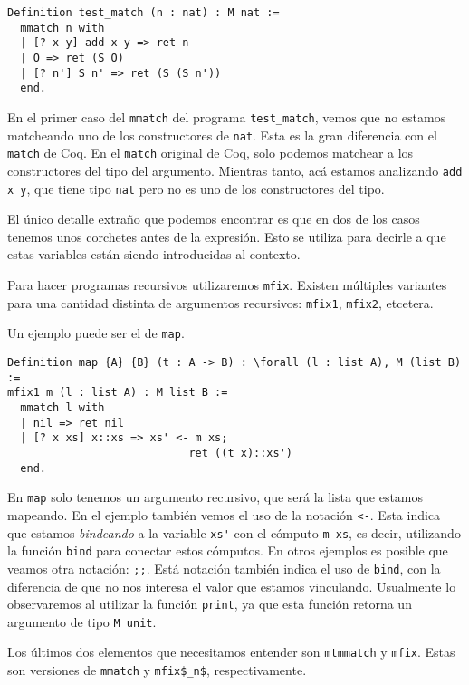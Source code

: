 \begin{lstlisting}
Definition test_match (n : nat) : M nat :=
  mmatch n with
  | [? x y] add x y => ret n
  | O => ret (S O)
  | [? n'] S n' => ret (S (S n'))
  end.
\end{lstlisting}

En el primer caso del \lstinline{mmatch} del programa \lstinline{test_match}, vemos que no estamos matcheando uno de los constructores de \lstinline{nat}.
Esta es la gran diferencia con el \lstinline{match} de Coq.
En el \lstinline{match} original de Coq, solo podemos matchear a los constructores del tipo del argumento.
Mientras tanto, acá estamos analizando \lstinline{add x y}, que tiene tipo \lstinline{nat} pero no es uno de los constructores del tipo.

El único detalle extraño que podemos encontrar es que en dos de los casos tenemos unos corchetes antes de la expresión.
Esto se utiliza para decirle a \Mtac que estas variables están siendo introducidas al contexto.

Para hacer programas recursivos utilizaremos \lstinline{mfix}. Existen múltiples variantes para una cantidad distinta de argumentos recursivos: \lstinline{mfix1}, \lstinline{mfix2}, etcetera.

Un ejemplo puede ser el de \lstinline{map}.

\begin{lstlisting}
Definition map {A} {B} (t : A -> B) : \forall (l : list A), M (list B) :=
mfix1 m (l : list A) : M list B :=
  mmatch l with
  | nil => ret nil
  | [? x xs] x::xs => xs' <- m xs;
                            ret ((t x)::xs')
  end.
\end{lstlisting}

En \lstinline{map} solo tenemos un argumento recursivo, que será la lista que estamos mapeando.
En el ejemplo también vemos el uso de la notación \lstinline{<-}.
Esta indica que estamos \emph{bindeando} a la variable \lstinline{xs'} con el cómputo \lstinline{m xs}, es decir, utilizando la función \lstinline{bind} para conectar estos cómputos.
En otros ejemplos es posible que veamos otra notación: \lstinline{;;}.
Está notación también indica el uso de \lstinline{bind}, con la diferencia de que no nos interesa el valor que estamos vinculando.
Usualmente lo observaremos al utilizar la función \lstinline{print}, ya que esta función retorna un argumento de tipo \lstinline{M unit}.

Los últimos dos elementos que necesitamos entender son \lstinline{mtmmatch} y \lstinline{mfix}.
Estas son versiones de \lstinline{mmatch} y \lstinline{mfix$_n$}, respectivamente.

